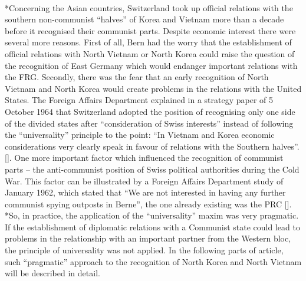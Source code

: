 \documentclass[a4paper]{article}
\begin{document}
\\*Concerning the Asian countries, Switzerland took up official relations with the southern non-communist “halves” of Korea and Vietnam more than a decade before it recognised their communist parts. Despite economic interest there were several more reasons. First of all, Bern had the worry that the establishment of official relations with North Vietnam or North Korea could raise the question of the recognition of East Germany which would endanger important relations with the FRG. Secondly, there was the fear that an early recognition of North Vietnam and North Korea would create problems in the relations with the United States. The Foreign Affairs Department explained in a strategy paper of 5 October 1964 that Switzerland adopted the position of recognising only one side of the divided states after “consideration of Swiss interests” instead of following the “universality” principle to the point: “In Vietnam and Korea economic considerations very clearly speak in favour of relations with the Southern halves”.[]. One more important factor which influenced the recognition of communist parts – the anti-communist position of Swiss political authorities during the Cold War. This factor can be illustrated by a Foreign Affairs Department study of January 1962, which stated that “We are not interested in having any further communist spying outposts in Berne”, the one already existing was the PRC [].
\\*So, in practice, the application of the “universality” maxim was very pragmatic. If the establishment of diplomatic relations with a Communist state could lead to problems in the relationship with an important partner from the Western bloc, the principle of universality was not applied. In the following parts of article, such “pragmatic” approach to the recognition of North Korea and North Vietnam will be described in detail.
\end{document}
